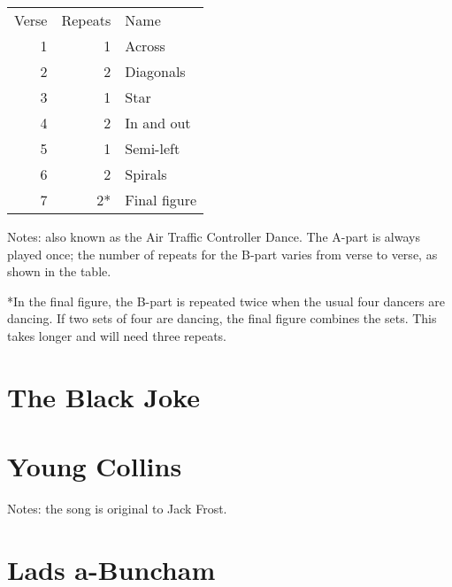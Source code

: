 \documentclass[12pt,a4paper]{article}
\begin{document}

\begin{minipage}[t]{6cm}
\vspace{0pt}
\begin{tabular}{rrl}
Verse & Repeats & Name \\
1 & 1 & Across \\
2 & 2 & Diagonals \\
3 & 1 & Star \\
4 & 2 & In and out \\
5 & 1 & Semi-left \\
6 & 2 & Spirals \\
7 & 2* & Final figure
\end{tabular}
\end{minipage} \hspace{3mm} \begin{minipage}[t]{10cm}
\vspace{0pt}
\noindent Notes: also known as the Air Traffic Controller Dance.
The A-part is always played once; the number of repeats for the
B-part varies from verse to verse, as shown in the table.

\smallskip

*In the final figure, the B-part is repeated twice when the usual four
dancers are dancing.  If two sets of four are dancing, the final
figure combines the sets. This takes longer and will need three
repeats.
\end{minipage}
\pagebreak[1]

\section{The Black Joke}


\pagebreak[1]

\section{Young Collins}


\noindent Notes: the song is original to Jack Frost.

\pagebreak[2]

\section{Lads a-Buncham}
\end{document}
